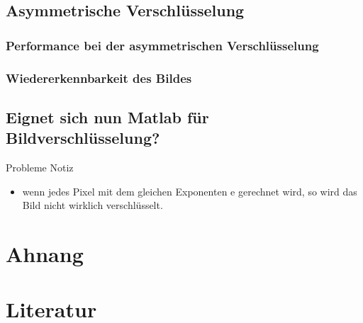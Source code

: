 \documentclass[paper=a4,fontsize=12pt]{scrartcl}
\begin{document}
\subsection{Asymmetrische Verschlüsselung}
\subsubsection{Performance bei der asymmetrischen Verschlüsselung}
\subsubsection{Wiedererkennbarkeit des Bildes}
 
 \subsection{Eignet sich nun Matlab für Bildverschlüsselung?} \label{problems-RSA}
 Probleme Notiz
 \begin{itemize}
  \item wenn jedes Pixel mit dem gleichen Exponenten e gerechnet wird, so wird das Bild nicht wirklich verschlüsselt.
\end{itemize}
\newpage
\section{Ahnang}

\newpage
\section{Literatur}
\end{document}
